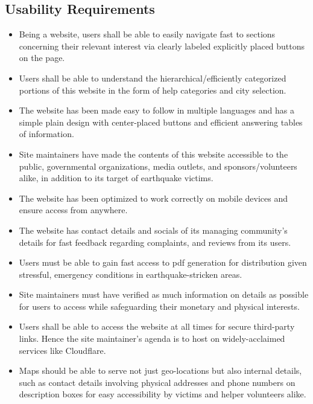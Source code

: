 \vspace*{\fill}
\newpage

\subsection{Usability Requirements}

\begin{itemize}
    \item Being a website, users shall be able to easily navigate fast to sections concerning their relevant interest via clearly labeled explicitly placed buttons on the page.
    \item Users shall be able to understand the hierarchical/efficiently categorized portions of this website in the form of help categories and city selection.
    \item The website has been made easy to follow in multiple languages and has a simple plain design with center-placed buttons and efficient answering tables of information.
    \item Site maintainers have made the contents of this website accessible to the public, governmental organizations, media outlets, and sponsors/volunteers alike, in addition to its target of earthquake victims.
    \item The website has been optimized to work correctly on mobile devices and ensure access from anywhere.
    \item The website has contact details and socials of its managing community's details for fast feedback regarding complaints, and reviews from its users.
    \item Users must be able to gain fast access to pdf generation for distribution given stressful, emergency conditions in earthquake-stricken areas.
    \item Site maintainers must have verified as much information on details as possible for users to access while safeguarding their monetary and physical interests.
    \item Users shall be able to access the website at all times for secure third-party links. Hence the site maintainer's agenda is to host on widely-acclaimed services like Cloudflare.
    \item Maps should be able to serve not just geo-locations but also internal details, such as contact details involving physical addresses and phone numbers on description boxes for easy accessibility by victims and helper volunteers alike.
\end{itemize}

